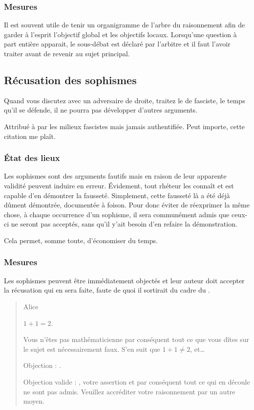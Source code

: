 \subsubsection{Mesures}
Il est souvent utile de tenir un organigramme de l’arbre du raisonnement afin de garder à l’esprit l’objectif global et les objectifs locaux. Lorsqu’une question à part entière apparait, le sous-débat est déclaré par l’arbitre et il faut l’avoir traiter avant de revenir au sujet principal.

\subsection{Récusation des sophismes}
\epigraph{Quand vous discutez avec un adversaire de droite, traitez le de fasciste, le temps qu’il se défende, il ne pourra pas développer d’autres arguments.}{Attribué à  par les milieux fascistes mais jamais authentifiée. Peut importe, cette citation me plaît.}
\subsubsection{État des lieux}
Les sophismes sont des arguments fautifs mais en raison de leur apparente validité peuvent induire en erreur. Évidement, tout rhéteur les connaît et est capable d’en démontrer la fausseté. Simplement, cette fausseté là a été déjà dûment démontrée, documentée à foison. Pour donc éviter de réexprimer la même chose, à chaque occurrence d’un sophisme, il sera communément admis que ceux-ci ne seront pas acceptés, sans qu’il y’ait besoin d’en refaire la démonstration.

Cela permet, somme toute, d’économiser du temps.

\subsubsection{Mesures}
Les sophismes peuvent être immédiatement objectés et leur auteur doit accepter la récusation qui en sera faite, faute de quoi il sortirait du cadre du \mainabbr{}.
\begin{quote}
  \begin{drama}{0cm}{0cm}{Alice}

    \Aspeaks       $1+1=2$.

    \Bspeaks       Vous n’êtes pas mathématicienne par conséquent tout ce que vous dîtes sur le sujet est nécessairement faux. S’en suit que $1+1\neq2$, et…

    \Aspeaks       Objection : .

    \Arbitrespeaks Objection valide : \B, votre assertion et par conséquent tout ce qui en découle ne sont pas admis. Veuillez accréditer votre raisonnement par un autre moyen.

  \end{drama}
\end{quote}

